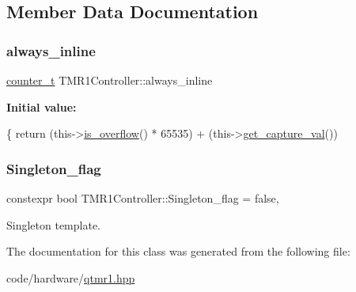 \subsection{Member Data Documentation}
\mbox{\label{classTMR1Controller_adce8e8a496510485a88ccc5b88595672}} 
\subsubsection{\texorpdfstring{always\+\_\+inline}{always\_inline}}
{\footnotesize\ttfamily \hyperlink{types_8hpp_a22f279793847eba127de149437848c48}{counter\+\_\+t} T\+M\+R1\+Controller\+::always\+\_\+inline}

{\bfseries Initial value\+:}
\begin{DoxyCode}
\{
        \textcolor{keywordflow}{return} (this->\hyperlink{classTMR1Controller_a06052b4a881156be3c7a4b6495d8ca11}{is\_overflow}() * 65535) + (this->\hyperlink{classTMR1Controller_a3d07eed72365e7a7b44fadefb23b9ba6}{get\_capture\_val}())
\end{DoxyCode}
\mbox{\label{classTMR1Controller_a532b729ca9a7c28e5f4d221f80487241}} 
\subsubsection{\texorpdfstring{Singleton\+\_\+flag}{Singleton\_flag}}
{\footnotesize\ttfamily constexpr bool T\+M\+R1\+Controller\+::\+Singleton\+\_\+flag = false\hspace{0.3cm}{\ttfamily [static]}, {\ttfamily [private]}}



Singleton template. 



The documentation for this class was generated from the following file\+:\begin{DoxyCompactItemize}
\item 
code/hardware/\hyperlink{qtmr1_8hpp}{qtmr1.\+hpp}\end{DoxyCompactItemize}
